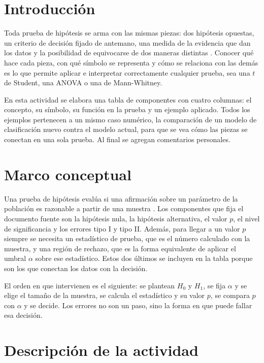 \documentclass[11pt,letterpaper]{article}
\begin{document}
\portada
\indicegeneral


\section{Introducción}

Toda prueba de hipótesis se arma con las mismas piezas: dos hipótesis opuestas, un criterio de decisión fijado de antemano, una medida de la evidencia que dan los datos y la posibilidad de equivocarse de dos maneras distintas \parencite{tecnm2026_documento_fuente}. Conocer qué hace cada pieza, con qué símbolo se representa y cómo se relaciona con las demás es lo que permite aplicar e interpretar correctamente cualquier prueba, sea una $t$ de Student, una ANOVA o una de Mann-Whitney.

En esta actividad se elabora una tabla de componentes con cuatro columnas: el concepto, su símbolo, su función en la prueba y un ejemplo aplicado. Todos los ejemplos pertenecen a un mismo caso numérico, la comparación de un modelo de clasificación nuevo contra el modelo actual, para que se vea cómo las piezas se conectan en una sola prueba. Al final se agregan comentarios personales.

\section{Marco conceptual}

Una prueba de hipótesis evalúa si una afirmación sobre un parámetro de la población es razonable a partir de una muestra \parencite{tecnm2026_documento_fuente}. Los componentes que fija el documento fuente son la hipótesis nula, la hipótesis alternativa, el valor $p$, el nivel de significancia y los errores tipo I y tipo II. Además, para llegar a un valor $p$ siempre se necesita un estadístico de prueba, que es el número calculado con la muestra, y una región de rechazo, que es la forma equivalente de aplicar el umbral $\alpha$ sobre ese estadístico. Estos dos últimos se incluyen en la tabla porque son los que conectan los datos con la decisión.

El orden en que intervienen es el siguiente: se plantean $H_0$ y $H_1$, se fija $\alpha$ y se elige el tamaño de la muestra, se calcula el estadístico y su valor $p$, se compara $p$ con $\alpha$ y se decide. Los errores no son un paso, sino la forma en que puede fallar esa decisión.

\section{Descripción de la actividad}
\end{document}
